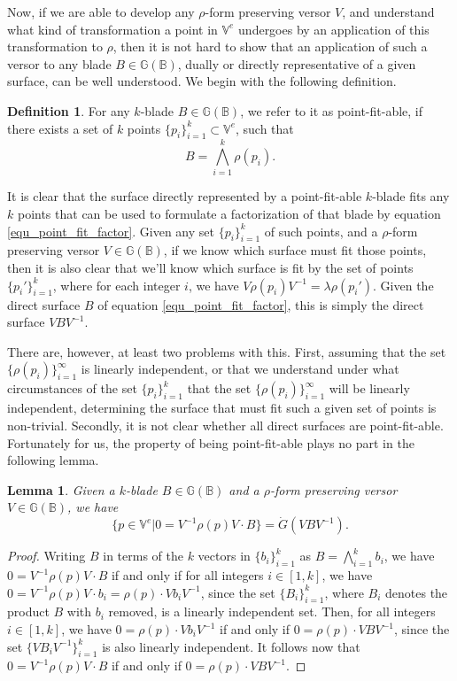 \documentclass{birkjour}
\newtheorem{lem}[thm]{Lemma}
\theoremstyle{definition}
\newtheorem{defn}[thm]{Definition}
\theoremstyle{remark}
\numberwithin{equation}{section}
\newcommand{\G}{\mathbb{G}}
\newcommand{\V}{\mathbb{V}}
\newcommand{\B}{\mathbb{B}}
\newcommand{\Gi}{\dot{G}}
\begin{document}
Now, if we are able to develop any $\rho$-form preserving versor $V$,
and understand what kind of transformation a point in $\V^e$ undergoes by an application
of this transformation to $\rho$, then it is not hard to show that an application of
such a versor to any blade $B\in\G(\B)$, dually or directly representative of a given surface,
can be well understood.
We begin with the following definition.
\begin{defn}
For any $k$-blade $B\in\G(\B)$, we refer to it as point-fit-able, if there
exists a set of $k$ points $\{p_i\}_{i=1}^k\subset\V^e$, such that
\begin{equation}\label{equ_point_fit_factor}
B = \bigwedge_{i=1}^k\rho(p_i).
\end{equation}
\end{defn}
It is clear that the surface directly represented by a point-fit-able $k$-blade fits
any $k$ points that can be used to formulate a factorization of that blade
by equation \eqref{equ_point_fit_factor}.  Given any set $\{p_i\}_{i=1}^k$ of such points,
and a $\rho$-form preserving versor $V\in\G(\B)$,
if we know which surface must fit those points, then it is also clear that
we'll know which surface is fit by the set of points $\{p_i'\}_{i=1}^k$,
where for each integer $i$, we have $V\rho(p_i)V^{-1}=\lambda\rho(p_i')$.
Given the direct surface $B$ of equation \eqref{equ_point_fit_factor}, this is simply the
direct surface $VBV^{-1}$.

There are, however, at least two problems with this.  First, assuming that
the set $\{\rho(p_i)\}_{i=1}^\infty$ is linearly independent, or that
we understand under what circumstances of the set $\{p_i\}_{i=1}^k$
that the set $\{\rho(p_i)\}_{i=1}^\infty$ will be linearly independent, determining the
surface that must fit such a given set of points is non-trivial.
Secondly, it is not clear whether all direct surfaces are point-fit-able.
Fortunately for us, the property of being point-fit-able plays no
part in the following lemma.

\begin{lem}\label{lem_xform_dual_geo}
Given a $k$-blade $B\in\G(\B)$ and a $\rho$-form preserving versor $V\in\G(\B)$,
we have
\begin{equation}
\{p\in\V^e|0=V^{-1}\rho(p)V\cdot B\}=\Gi(VBV^{-1}).
\end{equation}
\end{lem}
\begin{proof}
Writing $B$ in terms of the $k$ vectors in $\{b_i\}_{i=1}^k$ as $B=\bigwedge_{i=1}^k b_i$,
we have $0=V^{-1}\rho(p)V\cdot B$ if and only if for all integers $i\in[1,k]$,
we have $0=V^{-1}\rho(p)V\cdot b_i=\rho(p)\cdot Vb_iV^{-1}$, since the
set $\{B_i\}_{i=1}^k$, where $B_i$ denotes the product $B$ with $b_i$ removed,
is a linearly independent set.  Then, for all integers $i\in[1,k]$, we have $0=\rho(p)\cdot Vb_iV^{-1}$
if and only if $0=\rho(p)\cdot VBV^{-1}$, since
the set $\{VB_iV^{-1}\}_{i=1}^k$ is also linearly independent.
It follows now that $0=V^{-1}\rho(p)V\cdot B$ if and only if $0=\rho(p)\cdot VBV^{-1}$.
\end{proof}
\end{document}
